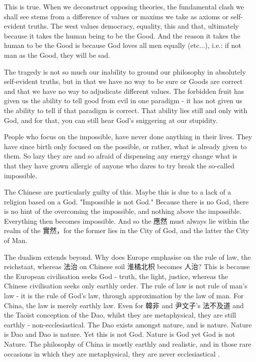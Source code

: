 This is true. When we deconstruct opposing theories, the fundamental clash we shall see stems from a difference of values or maxims we take as axioms or self-evident truths. The west values democracy, equality, this and that, ultimately because it takes the human being to be the Good. And the reason it takes the human to be the Good is because God loves all men equally (etc...), i.e.: if not man as the Good, they will be sad. 

The tragedy is not so much our inability to ground our philosophy in absolutely self-evident truths, but in that we have no way to be sure or Goods are correct and that we have no way to adjudicate different values. The forbidden fruit has given us the ability to tell good from evil in one paradigm - it has not given us the ability to tell if that paradigm is correct. That ability lies still and only with God, and for that, you can still hear God's sniggering at our stupidity. 





People who focus on the impossible, have never done anything in their lives. They have since birth only focused on the possible, or rather, what is already given to them. So lazy they are and so afraid of dispensing any energy change what is that they have grown allergic of anyone who dares to try break the so-called impossible. 

The Chinese are particularly guilty of this. Maybe this is due to a lack of a religion based on a God. "Impossible is not God." Because there is no God, there is no hint of the overcoming the impossible, and nothing above the impossible. Everything then becomes impossible. And so the 應然 must always lie within the realm of the 實然，for the former lies in the City of God, and the latter the City of Man. 

The dualism extends beyond. Why does Europe emphasise on the rule of law, the reichstaat, whereas 法治 on Chinese soil 淮橘北枳 becomes 人治? This is because the European civilisation seeks God - truth, the light, justice, whereas the Chinese civilisation seeks only earthly order. The rule of law is not rule of man's law - it is the rule of God's law, through approximation by the law of man. For China, the law is merely earthly law. Even for 韓非 and 尹文子's 法不及道 and the Taoist conception of the Dao, whilst they are metaphysical, they are still earthly - non-ecclesiastical. The Dao exists amongst nature, and is nature. Nature is Dao and Dao is nature. Yet this is not God. Nature is God yet God is not Nature. The philosophy of China is mostly earthly and realistic, and in those rare occasions in which they are metaphysical, they are never ecclesiastical .




